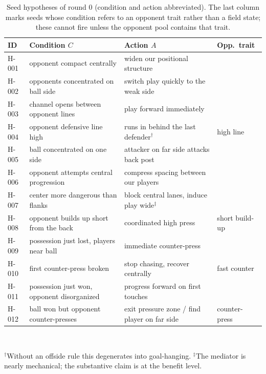 \documentclass[11pt]{article}
\begin{document}
\begin{table}[t]
\centering\footnotesize
\caption{Seed hypotheses of round 0 (condition and action abbreviated). The last column marks seeds whose condition refers to an opponent trait rather than a field state; these cannot fire unless the opponent pool contains that trait.}
\label{tab:seeds}
\begin{tabularx}{\linewidth}{@{}l X X l@{}}
\toprule
ID & Condition $C$ & Action $A$ & Opp.\ trait \\
\midrule
H-001 & opponent compact centrally & widen our positional structure & \\
H-002 & opponents concentrated on ball side & switch play quickly to the weak side & \\
H-003 & channel opens between opponent lines & play forward immediately & \\
H-004 & opponent defensive line high & runs in behind the last defender$^{\dagger}$ & high line \\
H-005 & ball concentrated on one side & attacker on far side attacks back post & \\
H-006 & opponent attempts central progression & compress spacing between our players & \\
H-007 & center more dangerous than flanks & block central lanes, induce play wide$^{\ddagger}$ & \\
H-008 & opponent builds up short from the back & coordinated high press & short build-up \\
H-009 & possession just lost, players near ball & immediate counter-press & \\
H-010 & first counter-press broken & stop chasing, recover centrally & fast counter \\
H-011 & possession just won, opponent disorganized & progress forward on first touches & \\
H-012 & ball won but opponent counter-presses & exit pressure zone / find player on far side & counter-press \\
\bottomrule
\end{tabularx}\\[2pt]
\raggedright\scriptsize $^{\dagger}$Without an offside rule this degenerates into goal-hanging. $^{\ddagger}$The mediator is nearly mechanical; the substantive claim is at the benefit level.
\end{table}
\end{document}

